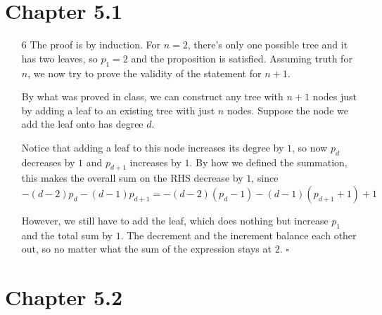 \documentclass[12pt]{article}
\begin{document}
\section{Chapter 5.1}

\begin{enumerate}
      \item[6] The proof is by induction.
      For $n=2$, there's only one possible tree and it has two leaves,
      so $p_1=2$ and the proposition is satisfied.
      Assuming truth for $n$, we now try to prove the validity of the statement for $n+1$.

      By what was proved in class, we can construct any tree with $n+1$ nodes
      just by adding a leaf to an existing tree with just $n$ nodes.
      Suppose the node we add the leaf onto has degree $d$.

      Notice that adding a leaf to this node increases its degree by $1$,
      so now $p_d$ decreases by $1$ and $p_{d+1}$ increases by $1$.
      By how we defined the summation, this makes the overall
      sum on the RHS decrease by $1$, since
      \[-(d-2)p_d-(d-1)p_{d+1}=-(d-2)(p_d-1)-(d-1)(p_{d+1}+1)+1\]

      However, we still have to add the leaf, which
      does nothing but increase $p_1$ and the total sum by $1$.
      The decrement and the increment balance each other out,
      so no matter what the sum of the expression stays at $2$. $\square$
\end{enumerate}

\pagebreak

\section{Chapter 5.2}
\end{document}
